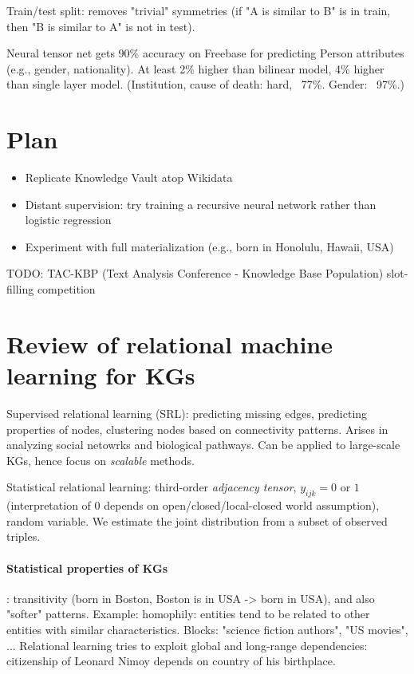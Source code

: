 Train/test split: removes "trivial" symmetries (if "A is similar to B" is in
train, then "B is similar to A" is not in test).

Neural tensor net gets 90\% accuracy on Freebase for predicting Person
attributes (e.g., gender, nationality). At least 2\% higher than bilinear model,
4\% higher than single layer model. (Institution, cause of death: hard, ~77\%.
Gender: ~97\%.)

\section{Plan}

\begin{itemize}
\item Replicate Knowledge Vault atop Wikidata
\item Distant supervision: try training a recursive neural network rather than
	logistic regression
\item Experiment with full materialization (e.g., born in Honolulu, Hawaii, USA)
\end{itemize}

TODO: TAC-KBP (Text Analysis Conference - Knowledge Base Population)
slot-filling competition

\section{Review of relational machine learning for KGs}
\cite{review-of-relational-ml-for-kgs}

Supervised relational learning (SRL): predicting missing edges, predicting
properties of nodes, clustering nodes based on connectivity patterns. Arises in
analyzing social netowrks and biological pathways. Can be applied to large-scale
KGs, hence focus on \textit{scalable} methods.

Statistical relational learning: third-order \textit{adjacency tensor},
$y_{ijk}=0$ or $1$ (interpretation of $0$ depends on open/closed/local-closed
world assumption), random variable. We estimate the joint distribution from a
subset of observed triples.

\paragraph{Statistical properties of KGs}: transitivity (born in Boston, Boston
is in USA -> born in USA), and also "softer" patterns. Example:
homophily: entities tend to be related to other entities with similar
characteristics. Blocks: "science fiction authors", "US movies", ...
Relational learning tries to exploit global and long-range dependencies:
citizenship of Leonard Nimoy depends on country of his birthplace.

